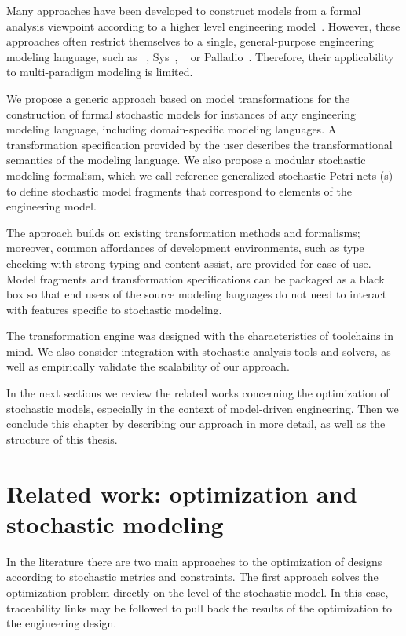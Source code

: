 Many approaches have been developed to construct models from a formal analysis viewpoint according to a higher level engineering model~. However, these approaches often restrict themselves to a single, general-purpose engineering modeling language, such as ~\citep{Rumbaugh04uml}, Sys~\citep{Friedenthal16sysml}, ~\citep{Feiler12aadl} or Palladio~\citep{Becker08palladio}. Therefore, their applicability to multi-paradigm modeling is limited.

We propose a generic approach based on model transformations for the construction of formal stochastic models for instances of any engineering modeling language, including domain-specific modeling languages. A transformation specification provided by the user describes the transformational semantics of the modeling language. We also propose a modular stochastic modeling formalism, which we call reference generalized stochastic Petri nets (s) to define stochastic model fragments that correspond to elements of the engineering model.

The approach builds on existing transformation methods and formalisms; moreover, common affordances of development environments, such as type checking with strong typing and content assist, are provided for ease of use. Model fragments and transformation specifications can be packaged as a black box so that end users of the source modeling languages do not need to interact with features specific to stochastic modeling.

The transformation engine was designed with the characteristics of  toolchains in mind. We also consider integration with stochastic analysis tools and solvers, as well as empirically validate the scalability of our approach.

In the next sections we review the related works concerning the optimization of stochastic models, especially in the context of model-driven engineering. Then we conclude this chapter by describing our approach in more detail, as well as the structure of this thesis.

\section{Related work: optimization and stochastic modeling}
\label{sec:intro:relwork}

In the literature there are two main approaches to the optimization of designs according to stochastic metrics and constraints. The first approach solves the optimization problem directly on the level of the stochastic model. In this case, traceability links may be followed to pull back the results of the optimization to the engineering design.

